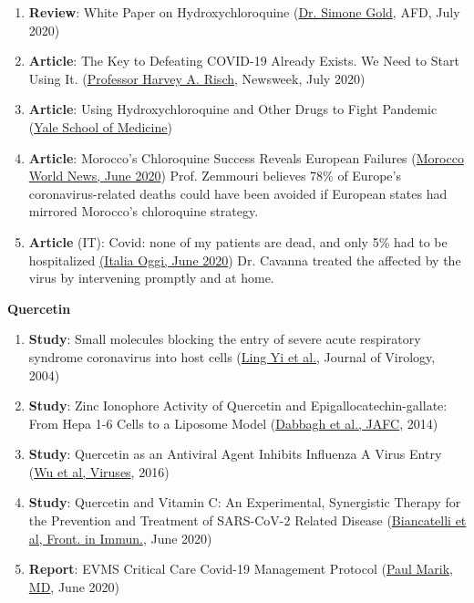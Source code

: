 \begin{enumerate}
{  Council of Medical Research}, March 2020)
\item
  \textbf{Review}: White Paper on Hydroxychloroquine
  (\href{https://swprs.files.wordpress.com/2020/07/hcq-white-paper-dr-simone-gold.pdf}{Dr.
  Simone Gold}, AFD, July 2020)
\item
  \textbf{Article}: The Key to Defeating COVID-19 Already Exists. We
  Need to Start Using It.
  (\href{https://www.newsweek.com/key-defeating-covid-19-already-exists-we-need-start-using-it-opinion-1519535}{Professor
  Harvey A. Risch}, Newsweek, July 2020)
\item
  \textbf{Article}: Using Hydroxychloroquine and Other Drugs to Fight
  Pandemic (\href{https://medicine.yale.edu/news-article/25085/}{Yale
  School of Medicine})
\item
  \textbf{Article}: Morocco's Chloroquine Success Reveals European
  Failures
  (\href{https://www.moroccoworldnews.com/2020/06/306587/moroccan-scientist-moroccos-chloroquine-success-reveals-european-failures/}{Morocco
  World News, June 2020}) Prof. Zemmouri believes 78\% of Europe's
  coronavirus-related deaths could have been avoided if European states
  had mirrored Morocco's chloroquine strategy.
\item
  \textbf{Article} (IT): Covid: none of my patients are dead, and only
  5\% had to be hospitalized
  \href{https://www.italiaoggi.it/news/covid-nessuno-dei-miei-e-morto-2454154}{(Italia
  Oggi, June 2020}) Dr. Cavanna treated the affected by the virus by
  intervening promptly and at home.
\end{enumerate}

\textbf{Quercetin}

\begin{enumerate}
\def\labelenumi{\arabic{enumi}.}
\tightlist
\item
  \textbf{Study}: Small molecules blocking the entry of severe acute
  respiratory syndrome coronavirus into host cells
  (\href{https://jvi.asm.org/content/78/20/11334.long}{Ling Yi et al.},
  Journal of Virology, 2004)
\item
  \textbf{Study}: Zinc Ionophore Activity of Quercetin and
  Epigallocatechin-gallate: From Hepa 1-6 Cells to a Liposome Model
  (\href{https://pubs.acs.org/doi/10.1021/jf5014633}{Dabbagh et al.,
  JAFC}, 2014)
\item
  \textbf{Study}: Quercetin as an Antiviral Agent Inhibits Influenza A
  Virus Entry
  (\href{https://www.ncbi.nlm.nih.gov/pmc/articles/PMC4728566/}{Wu et
  al, Viruses}, 2016)
\item
  \textbf{Study}: Quercetin and Vitamin C: An Experimental, Synergistic
  Therapy for the Prevention and Treatment of SARS-CoV-2 Related Disease
  (\href{https://www.frontiersin.org/articles/10.3389/fimmu.2020.01451/full}{Biancatelli
  et al, Front. in Immun.}, June 2020)
\item
  \textbf{Report}: EVMS Critical Care Covid-19 Management Protocol
  (\href{https://www.evms.edu/media/evms_public/departments/internal_medicine/EVMS_Critical_Care_COVID-19_Protocol.pdf}{Paul
  Marik, MD}, June 2020)
\end{enumerate}


